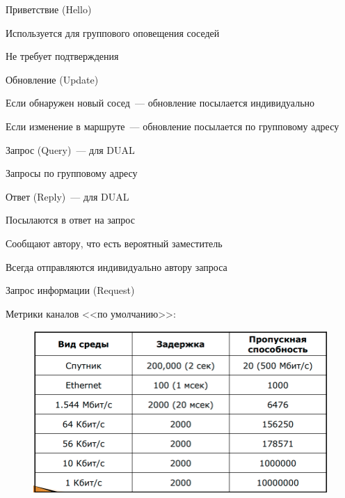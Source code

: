 \begin{MyItemize}
    \item Приветствие (Hello)
    \begin{MyItemize}
        \item Используется для группового оповещения соседей
        \item Не требует подтверждения
    \end{MyItemize}
    \item Обновление (Update)
    \begin{MyItemize}
        \item Если обнаружен новый сосед~--- обновление посылается индивидуально
        \item Если изменение в маршруте~--- обновление посылается по групповому адресу
    \end{MyItemize}
    \item Запрос (Query)~--- для DUAL
    \begin{MyItemize}
        \item Запросы по групповому адресу
    \end{MyItemize}
    \item Ответ (Reply)~--- для DUAL
    \begin{MyItemize}
        \item Посылаются в ответ на запрос
        \item Сообщают автору, что есть вероятный заместитель
        \item Всегда отправляются индивидуально автору запроса
    \end{MyItemize}
    \item Запрос информации (Request)
\end{MyItemize}

Метрики каналов <<по умолчанию>>:

\begin{figure}[H]
  \centering
  \includegraphics[width=15cm]{images/04/10}
\end{figure}

